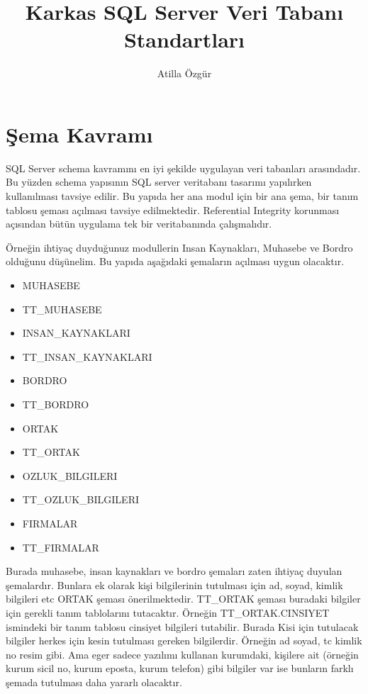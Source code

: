 \documentclass[10pt,a4paper,draft]{article}
\begin{document}
\author{Atilla Özgür}
\title{Karkas SQL Server Veri Tabanı Standartları}

\maketitle

\section{Şema Kavramı}


SQL Server schema kavramını en iyi şekilde uygulayan veri tabanları arasındadır.
Bu yüzden schema yapısının SQL server veritabanı tasarımı yapılırken kullanılması tavsiye edilir.
Bu yapıda her ana modul için bir ana şema, bir tanım tablosu şeması açılması tavsiye edilmektedir.
Referential  Integrity korunması açısından bütün uygulama tek bir veritabanında çalışmalıdır.

Örneğin ihtiyaç duyduğunuz modullerin Insan Kaynakları, Muhasebe ve Bordro olduğunu düşünelim. 
Bu yapıda aşağıdaki şemaların açılması uygun olacaktır.
\begin{itemize}
\item MUHASEBE
\item TT\_MUHASEBE
\item INSAN\_KAYNAKLARI
\item TT\_INSAN\_KAYNAKLARI
\item BORDRO
\item TT\_BORDRO
\item ORTAK
\item TT\_ORTAK
\item OZLUK\_BILGILERI
\item TT\_OZLUK\_BILGILERI
\item FIRMALAR
\item TT\_FIRMALAR

\end{itemize}


Burada muhasebe, insan kaynakları ve bordro şemaları zaten ihtiyaç duyulan şemalardır.
Bunlara ek olarak kişi bilgilerinin tutulması için ad, soyad, kimlik bilgileri etc ORTAK şeması
önerilmektedir. TT\_ORTAK şeması buradaki bilgiler için gerekli tanım tablolarını tutacaktır.
Örneğin TT\_ORTAK.CINSIYET ismindeki bir tanım tablosu cinsiyet bilgileri tutabilir.
Burada Kisi için tutulacak bilgiler herkes için kesin tutulması gereken bilgilerdir. 
Örneğin ad soyad, tc kimlik no resim gibi. Ama eger sadece yazılımı kullanan kurumdaki,
kişilere ait  (örneğin kurum sicil no, kurum eposta, kurum telefon) gibi bilgiler  var ise 
bunların farklı şemada tutulması daha yararlı olacaktır. 
\end{document}

